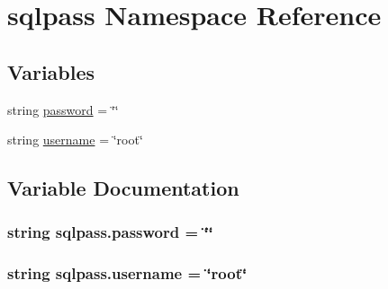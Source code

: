 \hypertarget{namespacesqlpass}{\section{sqlpass Namespace Reference}
\label{namespacesqlpass}
}
\subsection*{Variables}
\begin{DoxyCompactItemize}
\item 
string \hyperlink{namespacesqlpass_a99a8cd311321333802d3414356eecda9}{password} = \char`\"{}\char`\"{}
\item 
string \hyperlink{namespacesqlpass_a699df1a7cd75366536aade96ef0175ed}{username} = \char`\"{}root\char`\"{}
\end{DoxyCompactItemize}


\subsection{Variable Documentation}
\hypertarget{namespacesqlpass_a99a8cd311321333802d3414356eecda9}{
\subsubsection[{password}]{\setlength{\rightskip}{0pt plus 5cm}string sqlpass.\-password = \char`\"{}\char`\"{}}}\label{namespacesqlpass_a99a8cd311321333802d3414356eecda9}
\hypertarget{namespacesqlpass_a699df1a7cd75366536aade96ef0175ed}{
\subsubsection[{username}]{\setlength{\rightskip}{0pt plus 5cm}string sqlpass.\-username = \char`\"{}root\char`\"{}}}\label{namespacesqlpass_a699df1a7cd75366536aade96ef0175ed}
